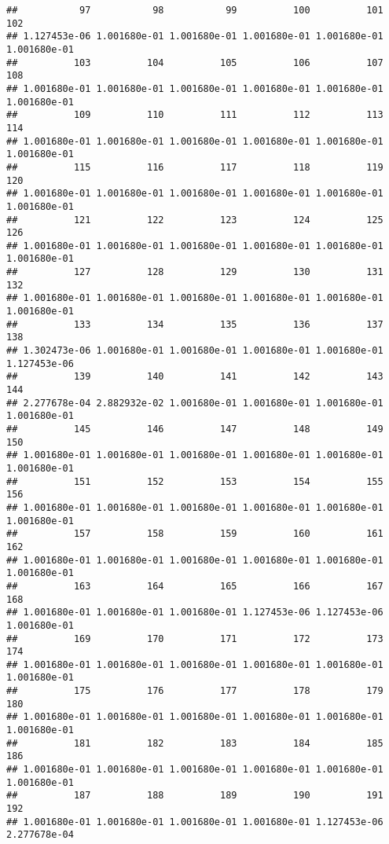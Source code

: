 \documentclass[
]{article}
\begin{document}
\begin{verbatim}
##           97           98           99          100          101          102 
## 1.127453e-06 1.001680e-01 1.001680e-01 1.001680e-01 1.001680e-01 1.001680e-01 
##          103          104          105          106          107          108 
## 1.001680e-01 1.001680e-01 1.001680e-01 1.001680e-01 1.001680e-01 1.001680e-01 
##          109          110          111          112          113          114 
## 1.001680e-01 1.001680e-01 1.001680e-01 1.001680e-01 1.001680e-01 1.001680e-01 
##          115          116          117          118          119          120 
## 1.001680e-01 1.001680e-01 1.001680e-01 1.001680e-01 1.001680e-01 1.001680e-01 
##          121          122          123          124          125          126 
## 1.001680e-01 1.001680e-01 1.001680e-01 1.001680e-01 1.001680e-01 1.001680e-01 
##          127          128          129          130          131          132 
## 1.001680e-01 1.001680e-01 1.001680e-01 1.001680e-01 1.001680e-01 1.001680e-01 
##          133          134          135          136          137          138 
## 1.302473e-06 1.001680e-01 1.001680e-01 1.001680e-01 1.001680e-01 1.127453e-06 
##          139          140          141          142          143          144 
## 2.277678e-04 2.882932e-02 1.001680e-01 1.001680e-01 1.001680e-01 1.001680e-01 
##          145          146          147          148          149          150 
## 1.001680e-01 1.001680e-01 1.001680e-01 1.001680e-01 1.001680e-01 1.001680e-01 
##          151          152          153          154          155          156 
## 1.001680e-01 1.001680e-01 1.001680e-01 1.001680e-01 1.001680e-01 1.001680e-01 
##          157          158          159          160          161          162 
## 1.001680e-01 1.001680e-01 1.001680e-01 1.001680e-01 1.001680e-01 1.001680e-01 
##          163          164          165          166          167          168 
## 1.001680e-01 1.001680e-01 1.001680e-01 1.127453e-06 1.127453e-06 1.001680e-01 
##          169          170          171          172          173          174 
## 1.001680e-01 1.001680e-01 1.001680e-01 1.001680e-01 1.001680e-01 1.001680e-01 
##          175          176          177          178          179          180 
## 1.001680e-01 1.001680e-01 1.001680e-01 1.001680e-01 1.001680e-01 1.001680e-01 
##          181          182          183          184          185          186 
## 1.001680e-01 1.001680e-01 1.001680e-01 1.001680e-01 1.001680e-01 1.001680e-01 
##          187          188          189          190          191          192 
## 1.001680e-01 1.001680e-01 1.001680e-01 1.001680e-01 1.127453e-06 2.277678e-04 

\end{verbatim}
\end{document}
